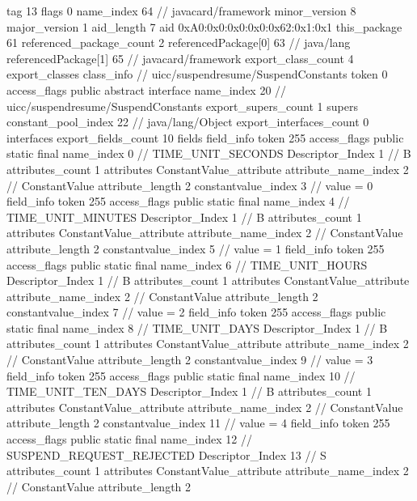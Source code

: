 {{{			tag	13
			flags	0
			name_index	64		// javacard/framework
			minor_version	8
			major_version	1
			aid_length	7
			aid	0xA0:0x0:0x0:0x0:0x62:0x1:0x1
		}
	}
	this_package	61
	referenced_package_count	2
	referencedPackage[0]	63		// java/lang
	referencedPackage[1]	65		// javacard/framework
	export_class_count	4
	export_classes {
		class_info {		// uicc/suspendresume/SuspendConstants
			token	0
			access_flags	public abstract interface
			name_index	20		// uicc/suspendresume/SuspendConstants
			export_supers_count	1
			supers {
				constant_pool_index	22		// java/lang/Object
			}
			export_interfaces_count	0
			interfaces {
			}
			export_fields_count	10
			fields {
			field_info {
				token	255
				access_flags	public static final
				name_index	0		// TIME_UNIT_SECONDS
				Descriptor_Index	1		// B
				attributes_count	1
				attributes {
				ConstantValue_attribute {
					attribute_name_index	2		// ConstantValue
					attribute_length	2
					constantvalue_index	3		// value = 0
				}
				}
			}
			field_info {
				token	255
				access_flags	public static final
				name_index	4		// TIME_UNIT_MINUTES
				Descriptor_Index	1		// B
				attributes_count	1
				attributes {
				ConstantValue_attribute {
					attribute_name_index	2		// ConstantValue
					attribute_length	2
					constantvalue_index	5		// value = 1
				}
				}
			}
			field_info {
				token	255
				access_flags	public static final
				name_index	6		// TIME_UNIT_HOURS
				Descriptor_Index	1		// B
				attributes_count	1
				attributes {
				ConstantValue_attribute {
					attribute_name_index	2		// ConstantValue
					attribute_length	2
					constantvalue_index	7		// value = 2
				}
				}
			}
			field_info {
				token	255
				access_flags	public static final
				name_index	8		// TIME_UNIT_DAYS
				Descriptor_Index	1		// B
				attributes_count	1
				attributes {
				ConstantValue_attribute {
					attribute_name_index	2		// ConstantValue
					attribute_length	2
					constantvalue_index	9		// value = 3
				}
				}
			}
			field_info {
				token	255
				access_flags	public static final
				name_index	10		// TIME_UNIT_TEN_DAYS
				Descriptor_Index	1		// B
				attributes_count	1
				attributes {
				ConstantValue_attribute {
					attribute_name_index	2		// ConstantValue
					attribute_length	2
					constantvalue_index	11		// value = 4
				}
				}
			}
			field_info {
				token	255
				access_flags	public static final
				name_index	12		// SUSPEND_REQUEST_REJECTED
				Descriptor_Index	13		// S
				attributes_count	1
				attributes {
				ConstantValue_attribute {
					attribute_name_index	2		// ConstantValue
					attribute_length	2
}}}}}}}
